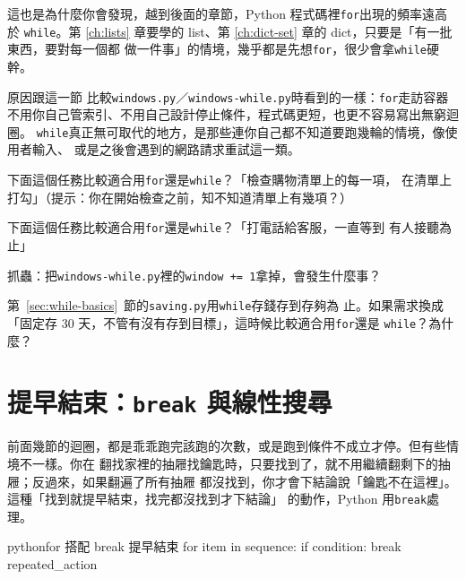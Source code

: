 
這也是為什麼你會發現，越到後面的章節，Python 程式碼裡\texttt{for}出現的頻率遠高於
\texttt{while}。第 \ref{ch:lists} 章要學的 list、第 \ref{ch:dict-set} 章的 dict，只要是「有一批東西，要對每一個都
做一件事」的情境，幾乎都是先想\texttt{for}，很少會拿\texttt{while}硬幹。

原因跟這一節
比較\texttt{windows.py}／\texttt{windows-while.py}時看到的一樣：\texttt{for}走訪容器
不用你自己管索引、不用自己設計停止條件，程式碼更短，也更不容易寫出無窮迴圈。
\texttt{while}真正無可取代的地方，是那些連你自己都不知道要跑幾輪的情境，像使用者輸入、
或是之後會遇到的網路請求重試這一類。

\begin{drills}[label=drills:for-vs-while]
\item 下面這個任務比較適合用\texttt{for}還是\texttt{while}？「檢查購物清單上的每一項，
在清單上打勾」（提示：你在開始檢查之前，知不知道清單上有幾項？）
\item 下面這個任務比較適合用\texttt{for}還是\texttt{while}？「打電話給客服，一直等到
有人接聽為止」
\item 抓蟲：把\texttt{windows-while.py}裡的\texttt{window += 1}拿掉，會發生什麼事？
\item 第~\ref{sec:while-basics}~節的\texttt{saving.py}用\texttt{while}存錢存到存夠為
止。如果需求換成「固定存 30 天，不管有沒有存到目標」，這時候比較適合用\texttt{for}還是
\texttt{while}？為什麼？
\end{drills}

\section{提早結束：\texttt{break} 與線性搜尋}
\label{sec:break-search}

前面幾節的迴圈，都是乖乖跑完該跑的次數，或是跑到條件不成立才停。但有些情境不一樣。你在
翻找家裡的抽屜找鑰匙時，只要找到了，就不用繼續翻剩下的抽屜；反過來，如果翻遍了所有抽屜
都沒找到，你才會下結論說「鑰匙不在這裡」。這種「找到就提早結束，找完都沒找到才下結論」
的動作，Python 用\texttt{break}處理。

\begin{code}{python}{for 搭配 break 提早結束}
for item in sequence:
    if condition:
        break
    repeated_action
\end{code}

